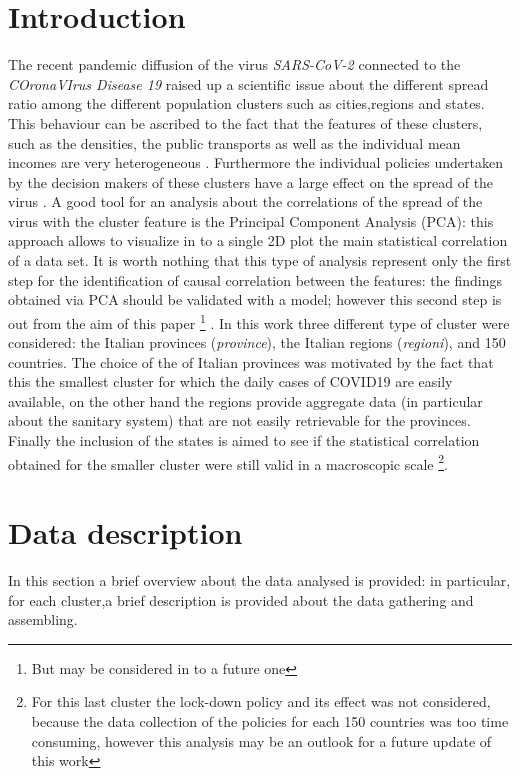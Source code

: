 \documentclass[
12pt, %
a4paper, %
oneside, %
headinclude,footinclude, %
BCOR5mm, %
]{scrartcl}
\begin{document}
\section{Introduction} \label{introduction}
The recent pandemic diffusion of the virus \textit{SARS-CoV-2} connected to the \textit{COronaVIrus Disease 19} raised up a scientific issue about the different spread ratio among the different population clusters such as cities,regions and states. This behaviour can be ascribed to the fact that the features of these clusters, such as the densities, the public transports as well as the individual mean incomes are very heterogeneous \cite{sebhatu2020explaining,skorka2020macroecology}. Furthermore the individual policies undertaken by the decision makers of these clusters have a large effect on the spread of the virus \cite{block2020social}. A good tool for an analysis about the correlations of the spread of the virus with the cluster feature is the Principal Component Analysis (PCA): this approach allows to visualize in to a single 2D plot the main statistical correlation of a data set. It is worth nothing that this type of analysis represent only the first step for the identification of causal correlation between the features: the findings obtained via PCA should be validated with a model; however this second step is out from the aim of this paper \footnote{But may be considered in to a future one} . In this work three different type of cluster were considered: the Italian provinces (\textit{province}), the Italian regions (\textit{regioni}), and 150 countries. The choice of the of Italian provinces was motivated by the fact that this the smallest cluster for which the daily cases of COVID19 are easily available, on the other hand the regions provide aggregate data (in particular about the sanitary system) that are not easily retrievable for the provinces. Finally the inclusion of the states is aimed to see if the statistical correlation obtained for the smaller cluster were still valid in a macroscopic scale \footnote{For this last cluster the lock-down policy and its effect was not considered, because the data collection of the policies for each 150 countries was too time consuming, however this analysis may be an outlook for a future update of this work}. 

\section{Data description} \label{Data_description}
In this section a brief overview about the data analysed is provided: in particular, for each cluster,a brief description is provided  about the data gathering and assembling. 
\end{document}
